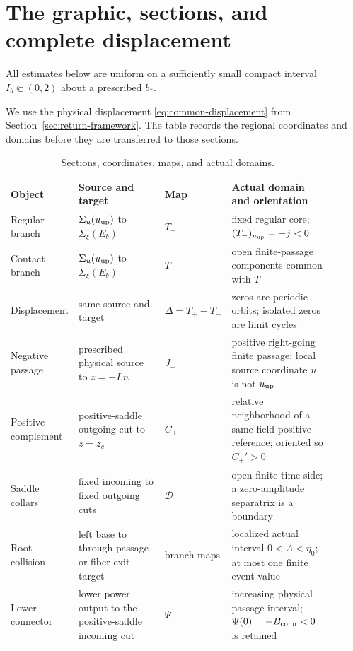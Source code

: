 \section{The graphic, sections, and complete displacement}\label{sec:geometry}
All estimates below are uniform on a sufficiently small compact interval
$I_b\Subset(0,2)$ about a prescribed $b_*$.

We use the physical displacement \eqref{eq:common-displacement} from
Section~\ref{sec:return-framework}. The table records the regional
coordinates and domains before they are transferred to those sections.

\begin{table}[H]
\centering
\caption{Sections, coordinates, maps, and actual domains.}
\label{tab:return-objects}
\small
\setlength{\tabcolsep}{3pt}
\begin{tabular}{@{}>{\raggedright\arraybackslash}p{0.14\linewidth}
                >{\raggedright\arraybackslash}p{0.27\linewidth}
                >{\raggedright\arraybackslash}p{0.18\linewidth}
                >{\raggedright\arraybackslash}p{0.32\linewidth}@{}}
\toprule
Object & Source and target & Map & Actual domain and orientation\\
\midrule
Regular branch & $\Sigma_u(u_{\rm up})$ to $\Sigma_\xi(E_b)$
 & $T_-$ & fixed regular core; $(T_-)_{u_{\rm up}}=-j<0$\\
Contact branch & $\Sigma_u(u_{\rm up})$ to $\Sigma_\xi(E_b)$
 & $T_+$ & open finite-passage components common with $T_-$\\
Displacement & same source and target
 & $\Delta=T_+-T_-$ & zeros are periodic orbits; isolated zeros are limit cycles\\
Negative passage & prescribed physical source to $z=-Ln$
 & $J_-$ & positive right-going finite passage; local source coordinate $u$ is not $u_{\rm up}$\\
Positive complement & positive-saddle outgoing cut to $z=z_c$
 & $C_+$ & relative neighborhood of a same-field positive reference; oriented so $C_+'>0$\\
Saddle collars & fixed incoming to fixed outgoing cuts
 & $\mathcal D$ & open finite-time side; a zero-amplitude separatrix is a boundary\\
Root collision & left base to through-passage or fiber-exit target
 & branch maps & localized actual interval $0<A<\eta_0$; at most one finite event value\\
Lower connector & lower power output to the positive-saddle incoming cut
 & $\Psi$ & increasing physical passage interval;
 $\Psi(0)=-B_{\rm conn}<0$ is retained\\
\bottomrule
\end{tabular}
\end{table}


